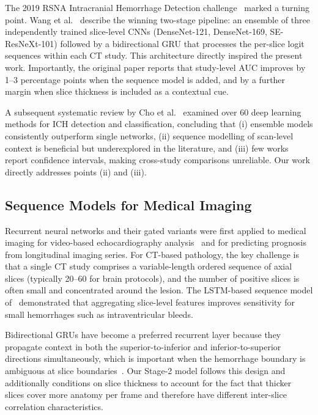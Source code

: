 The 2019 RSNA Intracranial Hemorrhage Detection
challenge~\cite{rsna2019} marked a turning point.
Wang et al.~\cite{wang2021deeplearning} describe the winning two-stage
pipeline: an ensemble of three independently trained slice-level CNNs
(DenseNet-121, DenseNet-169, SE-ResNeXt-101) followed by a bidirectional
GRU that processes the per-slice logit sequences within each CT study.
This architecture directly inspired the present work.
Importantly, the original paper reports that study-level AUC improves by
1--3 percentage points when the sequence model is added, and by a further
margin when slice thickness is included as a contextual cue.

A subsequent systematic review by Cho et al.~\cite{cho2021systematic}
examined over 60 deep learning methods for ICH detection and classification,
concluding that (i) ensemble models consistently outperform single networks,
(ii) sequence modelling of scan-level context is beneficial but
underexplored in the literature, and (iii) few works report confidence
intervals, making cross-study comparisons unreliable.
Our work directly addresses points (ii) and (iii).

\subsection{Sequence Models for Medical Imaging}

Recurrent neural networks and their gated variants were first applied to
medical imaging for video-based echocardiography
analysis~\cite{ouyang2020video} and for predicting prognosis from
longitudinal imaging series.
For CT-based pathology, the key challenge is that a single CT study
comprises a variable-length ordered sequence of axial slices
(typically 20--60 for brain protocols), and the number of positive slices
is often small and concentrated around the lesion.
The LSTM-based sequence model of~\cite{ye2019hemorrhage} demonstrated
that aggregating slice-level features improves sensitivity for small
hemorrhages such as intraventricular bleeds.

Bidirectional GRUs have become a preferred recurrent layer because they
propagate context in both the superior-to-inferior and inferior-to-superior
directions simultaneously, which is important when the hemorrhage boundary
is ambiguous at slice boundaries~\cite{wang2021deeplearning}.
Our Stage-2 model follows this design and additionally conditions on slice
thickness to account for the fact that thicker slices cover more anatomy
per frame and therefore have different inter-slice correlation
characteristics.

